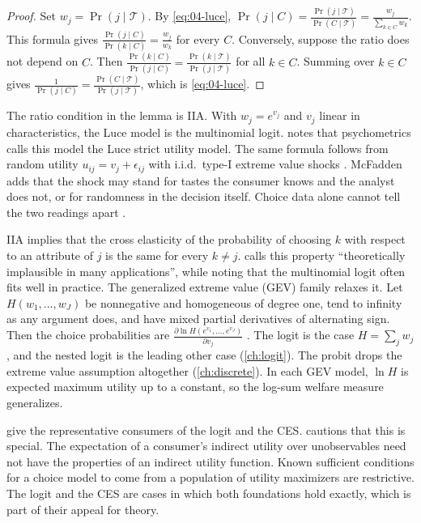\begin{proof}
Set $w_j = \Pr(j \mid \mathcal{T})$. By \eqref{eq:04-luce},
$\Pr(j \mid C) = \frac{\Pr(j \mid \mathcal{T})}{\Pr(C \mid \mathcal{T})} = \frac{w_j}{\sum_{k\in C}w_k}$. This formula
gives $\frac{\Pr(j \mid C)}{\Pr(k \mid C)} = \frac{w_j}{w_k}$ for every $C$. Conversely, suppose the
ratio does not depend on $C$. Then $\frac{\Pr(k \mid C)}{\Pr(j \mid C)} = \frac{\Pr(k \mid \mathcal{T})}{\Pr(j \mid \mathcal{T})}$ for all
$k \in C$. Summing over $k \in C$ gives $\frac{1}{\Pr(j \mid C)} = \frac{\Pr(C \mid \mathcal{T})}{\Pr(j \mid \mathcal{T})}$, which is
\eqref{eq:04-luce}.
\end{proof}

The ratio condition in the lemma is IIA. With $w_j = e^{v_j}$ and $v_j$ linear in characteristics, the Luce
model is the multinomial logit. \citet[p.~1412]{McFadden1984} notes that psychometrics calls this model the Luce
strict utility model. The same formula follows from random utility $u_{ij} = v_j + \epsilon_{ij}$ with i.i.d.\ type-I
extreme value shocks \citep{McFadden1974}. McFadden adds that the shock may stand for tastes the consumer knows
and the analyst does not, or for randomness in the decision itself. Choice data alone cannot tell the two readings
apart \citep[p.~1412]{McFadden1984}.

 IIA implies that the cross elasticity of the probability of choosing $k$ with respect to an
attribute of $j$ is the same for every $k \ne j$.  calls this property ``theoretically
implausible in many applications'', while noting that the multinomial logit often fits well in practice. The
generalized extreme value (GEV) family relaxes it. Let $H(w_1, \dots, w_J)$ be nonnegative and homogeneous of degree
one, tend to infinity as any argument does, and have mixed partial derivatives of alternating sign. Then the choice
probabilities are $\frac{\partial\ln H(e^{v_1}, \dots, e^{v_J})}{\partial v_j}$ \citep[eqs.~3.29--3.31,
p.~1421]{McFadden1984}. The logit is the case $H = \sum_jw_j$, and the nested logit is the leading other case
(\cref{ch:logit}). The probit drops the extreme value assumption altogether (\cref{ch:discrete}). In each GEV model,
$\ln H$ is expected maximum utility up to a constant, so the log-sum welfare measure generalizes.

  give the
representative consumers of the logit and the CES.  cautions that this is
special. The expectation of a consumer's indirect utility over unobservables need not have the properties of an
indirect utility function. Known sufficient conditions for a choice model to come from a population of utility
maximizers are restrictive. The logit and the CES are cases in which both foundations hold exactly, which is part
of their appeal for theory.

